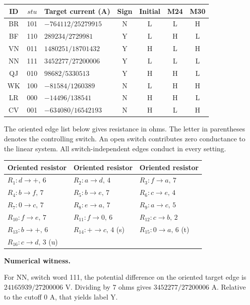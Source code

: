 \documentclass[12pt,letterpaper]{article}
\newcommand{\reading}[2]{\par\smallskip\textsf{\color{accent}\bfseries #1}\enspace #2\par}
\begin{document}
\begin{center}{\small\setlength{\tabcolsep}{4pt}\begin{tabularx}{\linewidth}{@{}ccYcccc@{}}\toprule
ID & $stu$ & Target current (A) & Sign & Initial & M24 & M30\\ \midrule
BR & 101 & $-764112/25279915$ & N & L & L & H\\
BF & 110 & $289234/2729981$ & Y & L & H & L\\
VN & 011 & $1480251/18701432$ & Y & H & L & H\\
NN & 111 & $3452277/27200006$ & Y & L & L & L\\
QJ & 010 & $98682/5330513$ & Y & H & H & L\\
WK & 100 & $-81584/1260389$ & N & L & H & H\\
LR & 000 & $-14496/138541$ & N & H & H & L\\
CV & 001 & $-634080/16542193$ & N & H & L & H\\
\bottomrule\end{tabularx}}\end{center}

The oriented edge list below gives resistance in ohms. The letter in parentheses denotes the controlling switch. An open switch contributes zero conductance to the linear system. All switch-independent edges conduct in every setting.

\begin{center}{\footnotesize\setlength{\tabcolsep}{4pt}\begin{tabularx}{\linewidth}{@{}YYY@{}}\toprule
Oriented resistor & Oriented resistor & Oriented resistor\\ \midrule
$R_{1}: d\!\to\!+,\,6$ & $R_{2}: a\!\to\!d,\,4$ & $R_{3}: f\!\to\!a,\,7$\\
$R_{4}: b\!\to\!f,\,7$ & $R_{5}: b\!\to\!e,\,7$ & $R_{6}: c\!\to\!e,\,4$\\
$R_{7}: 0\!\to\!c,\,7$ & $R_{8}: e\!\to\!a,\,7$ & $R_{9}: a\!\to\!c,\,5$\\
$R_{10}: f\!\to\!e,\,7$ & $R_{11}: f\!\to\!0,\,6$ & $R_{12}: c\!\to\!b,\,2$\\
$R_{13}: b\!\to\!+,\,6$ & $R_{14}: +\!\to\!c,\,4$ (s) & $R_{15}: 0\!\to\!a,\,6$ (t)\\
$R_{16}: c\!\to\!d,\,3$ (u) &  & \\
\bottomrule\end{tabularx}}\end{center}

\reading{Numerical witness.}{} For NN, switch word 111, the potential difference on the oriented target edge is $24165939/27200006$ V. Dividing by 7 ohms gives $3452277/27200006$ A. Relative to the cutoff $0$ A, that yields label Y.
\end{document}
